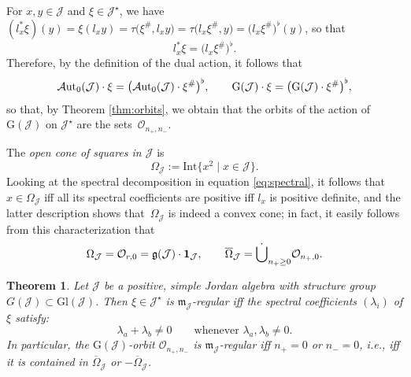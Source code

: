 \documentclass[pdftex]{sigma}
\numberwithin{equation}{section}
\newtheorem{Theorem}{Theorem}[section]
\newcommand{\be}{\begin{equation}}
\newcommand{\ee}{\end{equation}}
\newcommand{\Aut}{\mathcal{A}{\rm ut}}
\newcommand{\ocal}{\mathcal{O}}
\newcommand{\Jcal}{\mathcal{J}}
\newcommand{\m}{\mathfrak{m}}
\newcommand{\G}{\mathrm{G}}
\newcommand{\Gl}{{\mathrm{Gl}}}
\newcommand{\g}{{\mathfrak{g}}}
\renewcommand{\m}{{\mathfrak m}}
\begin{document}
For $x,y \in \Jcal$ and $\xi \in \Jcal^\star$, we have $(l_x^\ast \xi)(y) = \xi (l_x y) = \tau\big(\xi^{\#}, l_x y\big) = \tau\big(l_x \xi^{\#}, y\big) = \big(l_x \xi^{\#}\big)^\flat (y)$, so that
\be \label{eq:l*dual}
l_x^\ast \xi = \big(l_x \xi^{\#}\big)^\flat.
\ee
Therefore, by the definition of the dual action,
it follows that
\be \label{eq:dual-orbit}
\Aut_0(\Jcal) \cdot \xi = \big(\Aut_0(\Jcal) \cdot \xi^{\#}\big)^\flat, \qquad \G(\Jcal) \cdot \xi = \big(\G(\Jcal) \cdot \xi^{\#}\big)^\flat,
\ee
so that, by Theorem \ref{thm:orbits}, we obtain that the orbits of the action of $\G(\Jcal)$ on $\Jcal^\star$ are the sets~$\ocal_{n_+,n_-}$.

The {\em open cone of squares in $\Jcal$ }is
\[
\Omega_\Jcal := \mathrm{Int} \big\{x^2 \mid x \in \Jcal\big\}.
\]
Looking at the spectral decomposition in equation \eqref{eq:spectral}, it follows that $x \in \Omega_\Jcal$ iff all its spectral coefficients are positive iff $l_x$ is positive definite, and the latter description shows that~$\Omega_\Jcal$ is indeed a convex cone; in fact, it easily follows from this characterization that
\begin{gather} \Omega_\Jcal = \ocal_{r,0} = \g(\Jcal) \cdot {\bf 1}_\Jcal,\qquad
\overline{\Omega}_\Jcal = \dot \bigcup_{n_+ \geq 0} \ocal_{n_+,0}.\label{eq:positive-orbits}
\end{gather}

\begin{Theorem} \label{thm:main}
Let $\Jcal$ be a positive, simple Jordan algebra with structure group $G(\Jcal) \subset \Gl(\Jcal)$.
Then $\xi \in \Jcal^\star$ is $\m_\Jcal$-regular iff the spectral coefficients $(\lambda_i)$ of $\xi$ satisfy:
\be \label{eq:form-regular}
\lambda_a + \lambda_b \neq 0 \qquad \text{whenever $\lambda_a, \lambda_b \neq 0$}.
\ee
In particular, the $\G(\Jcal)$-orbit $\ocal_{n_+,n_-}$ is $\m_\Jcal$-regular iff $n_+ = 0$ or $n_-=0$, i.e., iff it is contained in $\overline{\Omega}_\Jcal$ or $-\overline{\Omega}_\Jcal$.
\end{Theorem}
\end{document}
